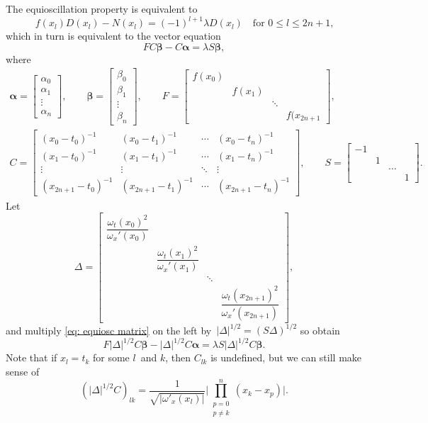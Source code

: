 \documentclass[12pt,a4paper]{article}
\begin{document}
The equioscillation property is equivalent to
\[
f(x_l)D(x_l)-N(x_l)=(-1)^{l+1}\lambda D(x_l)\quad\text{for $0\le l\le2n+1$,}
\]
which in turn is equivalent to the vector equation
\begin{equation}\label{eq: equiosc matrix}
FC\boldsymbol{\beta}-C\boldsymbol{\alpha}=\lambda S\boldsymbol{\beta},
\end{equation}
where
\begin{gather*}
\boldsymbol{\alpha}=\begin{bmatrix}
\alpha_0\\ \alpha_1\\ \vdots\\\alpha_n \end{bmatrix},\qquad
\boldsymbol{\beta}=\begin{bmatrix}
\beta_0\\ \beta_1\\ \vdots\\ \beta_n\end{bmatrix},\qquad
F=\begin{bmatrix}
f(x_0)&      &      &\\
      &f(x_1)&      &\\
      &      &\ddots&\\
      &      &      &f(x_{2n+1}
\end{bmatrix},\\
C=\begin{bmatrix}
(x_0-t_0)^{-1}&(x_0-t_1)^{-1}&\cdots&(x_0-t_n)^{-1}\\
(x_1-t_0)^{-1}&(x_1-t_1)^{-1}&\cdots&(x_1-t_n)^{-1}\\
\vdots        &\vdots        &\ddots&\vdots\\
(x_{2n+1}-t_0)^{-1}&(x_{2n+1}-t_1)^{-1}&\cdots&(x_{2n+1}-t_n)^{-1}
\end{bmatrix},\qquad
S=\begin{bmatrix}
-1&  &     &\\
  &1 &     &\\
  &  &\dots&\\
  &  &     &1
\end{bmatrix}.
\end{gather*}
Let
\[
\Delta=\begin{bmatrix}
\dfrac{\omega_t(x_0)^2}{\omega_x'(x_0)}& & &\\
&\dfrac{\omega_t(x_1)^2}{\omega_x'(x_1)}& &\\  
& &\ddots&\\
& & &\dfrac{\omega_t(x_{2n+1})^2}{\omega_x'(x_{2n+1})}
\end{bmatrix},
\]
and multiply \eqref{eq: equiosc matrix} on the left 
by~$|\Delta|^{1/2}=(S\Delta)^{1/2}$ so obtain
\begin{equation}\label{eq: equiosc Delta}
F|\Delta|^{1/2}C\boldsymbol{\beta}-|\Delta|^{1/2}C\boldsymbol{\alpha}
    =\lambda S|\Delta|^{1/2}C\boldsymbol{\beta}.
\end{equation}
Note that if $x_l=t_k$ for some $l$~and $k$, then $C_{lk}$ is undefined, but we 
can still make sense of
\[
(|\Delta|^{1/2}C)_{lk}=\frac{1}{\sqrt{|\omega'_x(x_l)|}}\biggl|
\prod_{\substack{p=0\\ p\ne k}}^n(x_k-x_p)\biggr|.
\]
\end{document}
